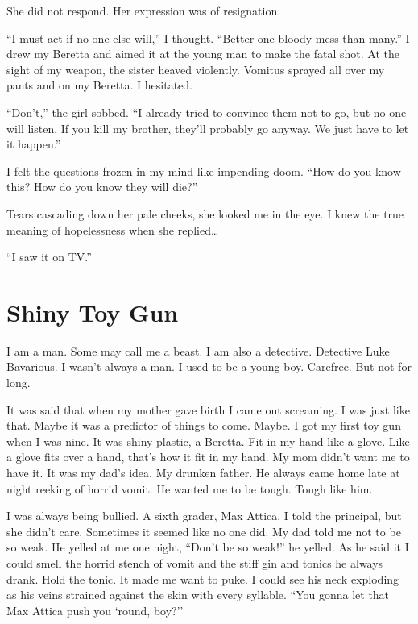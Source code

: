 She did not respond. Her expression was of resignation.



``I must act if no one else will,'' I thought.
``Better one bloody mess than many.'' I drew my Beretta
and aimed it at the young man to make the fatal shot. At the sight
of my weapon, the sister heaved violently. Vomitus sprayed all over
my pants and on my Beretta. I hesitated.



``Don't,'' the girl sobbed. ``I already tried
to convince them not to go, but no one will listen. If you kill my
brother, they'll probably go anyway. We just have to let it
happen.''



I felt the questions frozen in my mind like impending doom.
``How do you know this? How do you know they will
die?''



Tears cascading down her pale cheeks, she looked me in the eye. I
knew the true meaning of hopelessness when she
replied{\ldots}



``I saw it on TV.'' 
 





\chapter{Shiny Toy Gun}



I am a man. Some may call me a beast. I am also a detective.
Detective Luke Bavarious. I wasn't always a man. I used to be
a young boy. Carefree. But not for long.



It was said that when my mother gave birth I came out screaming. I
was just like that. Maybe it was a predictor of things to come.
Maybe. I got my first toy gun when I was nine. It was shiny
plastic, a Beretta. Fit in my hand like a glove. Like a glove fits
over a hand, that's how it fit in my hand. My mom
didn't want me to have it. It was my dad's idea. My
drunken father. He always came home late at night reeking of horrid
vomit. He wanted me to be tough. Tough like him.



I was always being bullied. A sixth grader, Max Attica. I told the
principal, but she didn't care. Sometimes it seemed like no
one did. My dad told me not to be so weak. He yelled at me one
night, ``Don't be so weak!'' he yelled. As he said
it I could smell the horrid stench of vomit and the stiff gin and
tonics he always drank. Hold the tonic. It made me want to puke. I
could see his neck exploding as his veins strained against the skin
with every syllable. ``You gonna let that Max Attica push you
`round, boy?''



